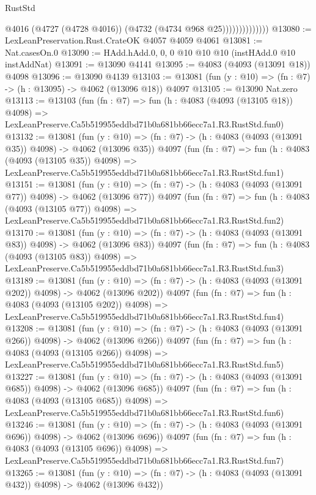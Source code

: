 \begin{lexlean}{RustStd}
\begin{coremodule}
                            @4016
                            (@4727 (@4728 @4016))
                            (@4732 (@4734 @968 @25))))))))))))))
@13080 := LexLeanPreservation.Rust.CrateOK @4057 @4059 @4061
@13081 := Nat.casesOn.{0}
@13090 := HAdd.hAdd.{0, 0, 0} @10 @10 @10 (instHAdd.{0} @10 instAddNat)
@13091 := @13090 @4141
@13095 := @4083 (@4093 (@13091 @18)) @4098
@13096 := @13090 @4139
@13103 := @13081 (fun (y : @10) => (fn : @7) -> (h : @13095) -> @4062 (@13096 @18)) @4097
@13105 := @13090 Nat.zero
@13113 := @13103
    (fun (fn : @7) =>
    fun (h : @4083 (@4093 (@13105 @18)) @4098) =>
    LexLeanPreserve.Ca5b519955eddbd71b0a681bb66ecc7a1.R3.RustStd.fun0)
@13132 := @13081
    (fun (y : @10) => (fn : @7) -> (h : @4083 (@4093 (@13091 @35)) @4098) -> @4062 (@13096 @35))
    @4097
    (fun (fn : @7) =>
    fun (h : @4083 (@4093 (@13105 @35)) @4098) =>
    LexLeanPreserve.Ca5b519955eddbd71b0a681bb66ecc7a1.R3.RustStd.fun1)
@13151 := @13081
    (fun (y : @10) => (fn : @7) -> (h : @4083 (@4093 (@13091 @77)) @4098) -> @4062 (@13096 @77))
    @4097
    (fun (fn : @7) =>
    fun (h : @4083 (@4093 (@13105 @77)) @4098) =>
    LexLeanPreserve.Ca5b519955eddbd71b0a681bb66ecc7a1.R3.RustStd.fun2)
@13170 := @13081
    (fun (y : @10) => (fn : @7) -> (h : @4083 (@4093 (@13091 @83)) @4098) -> @4062 (@13096 @83))
    @4097
    (fun (fn : @7) =>
    fun (h : @4083 (@4093 (@13105 @83)) @4098) =>
    LexLeanPreserve.Ca5b519955eddbd71b0a681bb66ecc7a1.R3.RustStd.fun3)
@13189 := @13081
    (fun (y : @10) => (fn : @7) -> (h : @4083 (@4093 (@13091 @202)) @4098) -> @4062 (@13096 @202))
    @4097
    (fun (fn : @7) =>
    fun (h : @4083 (@4093 (@13105 @202)) @4098) =>
    LexLeanPreserve.Ca5b519955eddbd71b0a681bb66ecc7a1.R3.RustStd.fun4)
@13208 := @13081
    (fun (y : @10) => (fn : @7) -> (h : @4083 (@4093 (@13091 @266)) @4098) -> @4062 (@13096 @266))
    @4097
    (fun (fn : @7) =>
    fun (h : @4083 (@4093 (@13105 @266)) @4098) =>
    LexLeanPreserve.Ca5b519955eddbd71b0a681bb66ecc7a1.R3.RustStd.fun5)
@13227 := @13081
    (fun (y : @10) => (fn : @7) -> (h : @4083 (@4093 (@13091 @685)) @4098) -> @4062 (@13096 @685))
    @4097
    (fun (fn : @7) =>
    fun (h : @4083 (@4093 (@13105 @685)) @4098) =>
    LexLeanPreserve.Ca5b519955eddbd71b0a681bb66ecc7a1.R3.RustStd.fun6)
@13246 := @13081
    (fun (y : @10) => (fn : @7) -> (h : @4083 (@4093 (@13091 @696)) @4098) -> @4062 (@13096 @696))
    @4097
    (fun (fn : @7) =>
    fun (h : @4083 (@4093 (@13105 @696)) @4098) =>
    LexLeanPreserve.Ca5b519955eddbd71b0a681bb66ecc7a1.R3.RustStd.fun7)
@13265 := @13081
    (fun (y : @10) => (fn : @7) -> (h : @4083 (@4093 (@13091 @432)) @4098) -> @4062 (@13096 @432))

\end{coremodule}
\end{lexlean}
